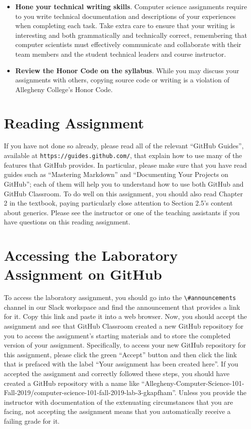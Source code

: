 \documentclass[11pt]{article}
\newcommand{\url}[1]{\lstinline{#1}}
\newcommand{\channel}[1]{\lstinline{#1}}
\begin{document}
\begin{itemize}
\item {\bf Hone your technical writing skills}. Computer science assignments
  require to you write technical documentation and descriptions of your
  experiences when completing each task. Take extra care to ensure that your
  writing is interesting and both grammatically and technically correct,
  remembering that computer scientists must effectively communicate and
  collaborate with their team members and the student technical leaders and
  course instructor.

\item {\bf Review the Honor Code on the syllabus}. While you may discuss your
  assignments with others, copying source code or writing is a violation of
  Allegheny College's Honor Code.

\end{itemize}

\section*{Reading Assignment}

If you have not done so already, please read all of the relevant ``GitHub
Guides'', available at \url{https://guides.github.com/}, that explain how to use
many of the features that GitHub provides. In particular, please make sure that
you have read guides such as ``Mastering Markdown'' and ``Documenting Your
Projects on GitHub''; each of them will help you to understand how to use both
GitHub and GitHub Classroom. To do well on this assignment, you should also read
Chapter 2 in the textbook, paying particularly close attention to Section 2.5's
content about generics. Please see the instructor or one of the teaching
assistants if you have questions on this reading assignment.

\section*{Accessing the Laboratory Assignment on GitHub}

To access the laboratory assignment, you should go into the
\channel{\#announcements} channel in our Slack workspace and find the
announcement that provides a link for it. Copy this link and paste it into a web
browser. Now, you should accept the assignment and see that GitHub Classroom
created a new GitHub repository for you to access the assignment's starting
materials and to store the completed version of your assignment. Specifically,
to access your new GitHub repository for this assignment, please click the green
``Accept'' button and then click the link that is prefaced with the label ``Your
assignment has been created here''. If you accepted the assignment and correctly
followed these steps, you should have created a GitHub repository with a name
like
``Allegheny-Computer-Science-101-Fall-2019/computer-science-101-fall-2019-lab-3-gkapfham''.
Unless you provide the instructor with documentation of the extenuating
circumstances that you are facing, not accepting the assignment means that you
automatically receive a failing grade for it.
\end{document}
